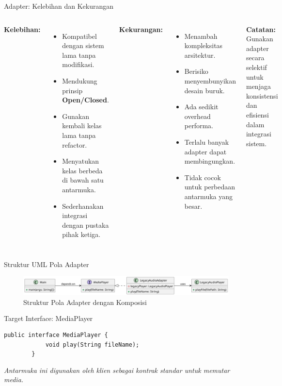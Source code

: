 \documentclass[aspectratio=169, table]{beamer}
\begin{document}
\begin{frame}[fragile]{Adapter: Kelebihan dan Kekurangan}
	\vspace{20pt}
	\begin{columns}[T]
		\textbf{Kelebihan:}
		\begin{itemize}
			\item Kompatibel dengan sistem lama tanpa modifikasi.
			\item Mendukung prinsip \textbf{Open/Closed}.
			\item Gunakan kembali kelas lama tanpa refactor.
			\item Menyatukan kelas berbeda di bawah satu antarmuka.
			\item Sederhanakan integrasi dengan pustaka pihak ketiga.
		\end{itemize}
		
		\textbf{Kekurangan:}
		\begin{itemize}
			\item Menambah kompleksitas arsitektur.
			\item Berisiko menyembunyikan desain buruk.
			\item Ada sedikit overhead performa.
			\item Terlalu banyak adapter dapat membingungkan.
			\item Tidak cocok untuk perbedaan antarmuka yang besar.
		\end{itemize}
		
		\vspace{10pt}
		\textbf{Catatan:} Gunakan adapter secara selektif untuk menjaga konsistensi dan efisiensi dalam integrasi sistem.
	\end{columns}
\end{frame}

\begin{frame}[fragile]{Struktur UML Pola Adapter}
	\vspace{20pt}
	\begin{figure}
		\centering
		\includegraphics[width=\textwidth]{../../figures/out/adapter.png}
		\caption{Struktur Pola Adapter dengan Komposisi}
	\end{figure}
\end{frame}

\begin{frame}[fragile]{Target Interface: MediaPlayer}
	\vspace{20pt}
	\begin{lstlisting}[style=JavaStyle]
		public interface MediaPlayer {
			void play(String fileName);
		}
	\end{lstlisting}
	\smallskip
	\textit{Antarmuka ini digunakan oleh klien sebagai kontrak standar untuk memutar media.}
\end{frame}
\end{document}
